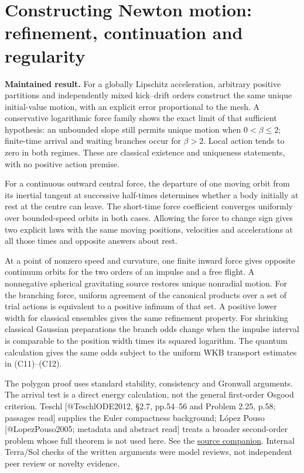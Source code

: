 \documentclass[11pt,a4paper]{article}
\begin{document}
\section{Constructing Newton motion: refinement, continuation and
regularity}\label{constructing-newton-motion-refinement-continuation-and-regularity}

\textbf{Maintained result.} For a globally Lipschitz acceleration,
arbitrary positive partitions and independently mixed kick--drift orders
construct the same unique initial-value motion, with an explicit error
proportional to the mesh. A conservative logarithmic force family shows
the exact limit of that sufficient hypothesis: an unbounded slope still
permits unique motion when \(0<\beta\le2\); finite-time arrival and
waiting branches occur for \(\beta>2\). Local action tends to zero in
both regimes. These are classical existence and uniqueness statements,
with no positive action premise.

For a continuous outward central force, the departure of one moving
orbit from its inertial tangent at successive half-times determines
whether a body initially at rest at the centre can leave. The short-time
force coefficient converges uniformly over bounded-speed orbits in both
cases. Allowing the force to change sign gives two explicit laws with
the same moving positions, velocities and accelerations at all those
times and opposite answers about rest.

At a point of nonzero speed and curvature, one finite inward force gives
opposite continuum orbits for the two orders of an impulse and a free
flight. A nonnegative spherical gravitating source restores unique
nonradial motion. For the branching force, uniform agreement of the
canonical products over a set of trial actions is equivalent to a
positive infimum of that set. A positive lower width for classical
ensembles gives the same refinement property. For shrinking classical
Gaussian preparations the branch odds change when the impulse interval
is comparable to the position width times its squared logarithm. The
quantum calculation gives the same odds subject to the uniform WKB
transport estimates in (C11)--(C12).

The polygon proof uses standard stability, consistency and Gronwall
arguments. The arrival test is a direct energy calculation, not the
general first-order Osgood criterion. Teschl {[}@TeschlODE2012, §2.7,
pp.54--56 and Problem 2.25, p.58; passages read{]} supplies the Euler
compactness background; López Pouso {[}@LopezPouso2005; metadata and
abstract read{]} treats a broader second-order problem whose full
theorem is not used here. See the
\href{../docs/Teschl_ODE_2012.md}{source companion}. Internal Terra/Sol
checks of the written arguments were model reviews, not independent peer
review or novelty evidence.
\end{document}
